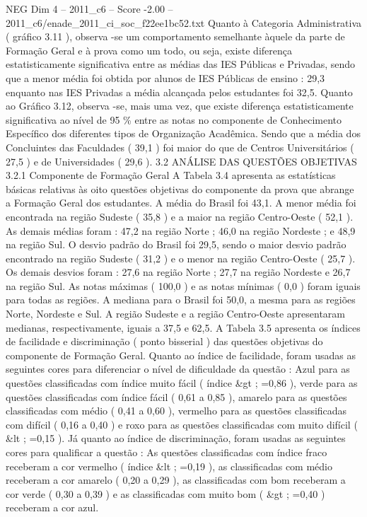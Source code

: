 \begin{textsample}{NEG Dim 4 – 2011\_c6 – Score -2.00 – 2011\_c6/enade\_2011\_ci\_soc\_f22ee1bc52.txt}
Quanto à Categoria Administrativa ( gráfico 3.11 ), observa -se um comportamento semelhante àquele da parte de Formação Geral e à prova como um todo, ou seja, existe diferença estatisticamente significativa entre as médias das IES Públicas e Privadas, sendo que a menor média foi obtida por alunos de IES Públicas de ensino : 29,3 enquanto nas IES Privadas a média alcançada pelos estudantes foi 32,5.
Quanto ao Gráfico 3.12, observa -se, mais uma vez, que existe diferença estatisticamente significativa ao nível de 95 \% entre as notas no componente de Conhecimento Específico dos diferentes tipos de Organização Acadêmica.
Sendo que a média dos Concluintes das Faculdades ( 39,1 ) foi maior do que de Centros Universitários ( 27,5 ) e de Universidades ( 29,6 ). 3.2 ANÁLISE DAS QUESTÕES OBJETIVAS 3.2.1 Componente de Formação Geral A Tabela 3.4 apresenta as estatísticas básicas relativas às oito questões objetivas do componente da prova que abrange a Formação Geral dos estudantes.
A média do Brasil foi 43,1.
A menor média foi encontrada na região Sudeste ( 35,8 ) e a maior na região Centro-Oeste ( 52,1 ).
As demais médias foram : 47,2 na região Norte ; 46,0 na região Nordeste ; e 48,9 na região Sul.
O desvio padrão do Brasil foi 29,5, sendo o maior desvio padrão encontrado na região Sudeste ( 31,2 ) e o menor na região Centro-Oeste ( 25,7 ).
Os demais desvios foram : 27,6 na região Norte ; 27,7 na região Nordeste e 26,7 na região Sul.
As notas máximas ( 100,0 ) e as notas mínimas ( 0,0 ) foram iguais para todas as regiões.
A mediana para o Brasil foi 50,0, a mesma para as regiões Norte, Nordeste e Sul.
A região Sudeste e a região Centro-Oeste apresentaram medianas, respectivamente, iguais a 37,5 e 62,5.
A Tabela 3.5 apresenta os índices de facilidade e discriminação ( ponto bisserial ) das questões objetivas do componente de Formação Geral.
Quanto ao índice de facilidade, foram usadas as seguintes cores para diferenciar o nível de dificuldade da questão : Azul para as questões classificadas com índice muito fácil ( índice \&gt ; =0,86 ), verde para as questões classificadas com índice fácil ( 0,61 a 0,85 ), amarelo para as questões classificadas com médio ( 0,41 a 0,60 ), vermelho para as questões classificadas com difícil ( 0,16 a 0,40 ) e roxo para as questões classificadas com muito difícil ( \&lt ; =0,15 ).
Já quanto ao índice de discriminação, foram usadas as seguintes cores para qualificar a questão : As questões classificadas com índice fraco receberam a cor vermelho ( índice \&lt ; =0,19 ), as classificadas com médio receberam a cor amarelo ( 0,20 a 0,29 ), as classificadas com bom receberam a cor verde ( 0,30 a 0,39 ) e as classificadas com muito bom ( \&gt ; =0,40 ) receberam a cor azul.

\end{textsample}
